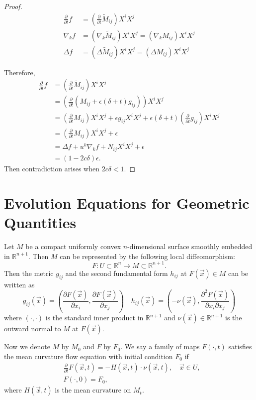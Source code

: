 \documentclass[a4paper]{report}
\newcommand{\R}{\mathbb{R}}
\theoremstyle{remark}
\begin{document}
\begin{proof}
	\begin{align*}
		\frac{\partial }{\partial t} f&=(\frac{\partial }{\partial t} \tilde{M}_{ij }^{}) X^i X^j\\
		\nabla_k f&= (\nabla_k \tilde{M}_{ij }^{}) X^i X^j = (\nabla_k M_{ij }^{} )X^i X^j\\
		\Delta f &= (\Delta  \tilde{M}_{ij }^{}) X^i X^j = (\Delta M_{ij }^{} )X^i X^j
	\end{align*}
	
	Therefore,
	\begin{equation*}
	\begin{split}
		\frac{\partial }{\partial t} f
		&=(\frac{\partial }{\partial t} \tilde{M}_{ij }^{}) X^i X^j\\
	&= (\frac{\partial }{\partial t} (M_{ij }^{} + \epsilon (\delta +t) g_{ij }^{} )) X^i X^j\\
	&= (\frac{\partial }{\partial t} M_{ij }^{} ) X^i X^j +\epsilon g_{ij }^{} X^i X^j+ \epsilon (\delta +t)(\frac{\partial }{\partial t} g_{ij }^{}) X^i X^j\\
	&= (\frac{\partial }{\partial t} M_{ij }^{} ) X^i X^j +\epsilon\\
	&= \Delta f + u^k \nabla_{k}^{} f +N_{ij }^{} X^i X^j + \epsilon \\
	&= (1-2c \delta ) \epsilon.
	\end{split}
	\end{equation*}
	Then contradiction arises when $2c \delta <1.$ 
\end{proof}

\section{Evolution Equations for Geometric Quantities}

Let $M$ be a compact uniformly convex $n$-dimensional surface smoothly embedded in $\R^{n+1}$. Then $M$ can be represented by the following local diffeomorphism:
\[
	F: U \subset \R^n \rightarrow M \subset \R^{n+1}.
\]
Then the metric $g_{ij}$ and the second fundamental form $h_{ij}$ at $F(\vec{x}) \in M$ can be written as
\[
	g_{ij}(\vec{x})=\left( \frac{\partial F(\vec{x})}{\partial x_i}, \frac{\partial F(\vec{x})}{\partial x_j} \right) \quad h_{ij}(\vec{x})=\left( -\nu (\vec{x}), \frac{\partial^2 F(\vec{x})}{\partial x_i \partial x_j} \right)
\]
where $\left( \cdot , \cdot \right) $ is the standard inner product in $\R^{n+1}$ and $\nu (\vec{x}) \in \R^{n+1}$ is the outward normal to $M$ at $F(\vec{x})$.

Now we denote $M$ by $M_0$ and $F$ by $F_0$. We say a family of maps $F(\cdot , t)$ satisfies the mean curvature flow equation with initial condition $F_0$ if
\begin{align*}
	 & \frac{\partial }{\partial t} F(\vec{x},t)=-H(\vec{x},t) \cdot \nu (\vec{x},t), \quad \vec{x} \in U, \\
	 & F(\cdot ,0)=F_0,
\end{align*}
where $H(\vec{x},t)$ is the mean curvature on $M_t$.
\end{document}
